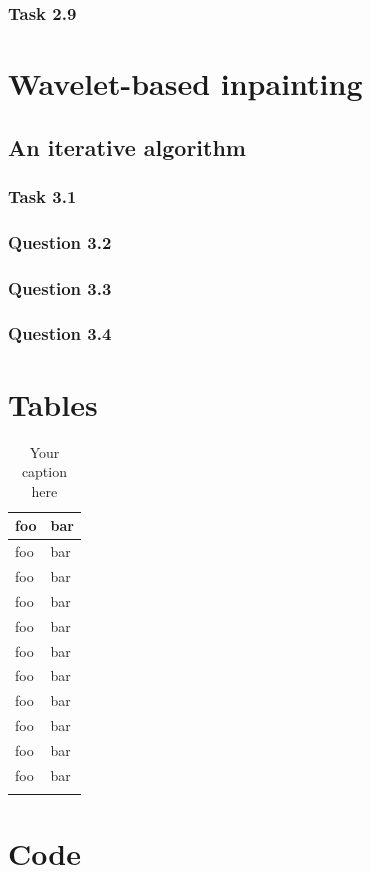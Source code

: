 \documentclass[a4paper]{article}
\begin{document}
    \subsubsection{Task 2.9}

	\newpage
	
    \section{Wavelet-based inpainting}

    \subsection{An iterative algorithm}

    \subsubsection{Task 3.1}

    \subsubsection{Question 3.2}

    \subsubsection{Question 3.3}

    \subsubsection{Question 3.4}

	\newpage

	\appendix
	
	\section{Tables}
	
	\begin{longtable}{| p{} | p{} |} 
	\hline
	foo & bar \\ \hline 
	foo & bar \\ \hline
	foo & bar \\ \hline
	foo & bar \\ \hline
	foo & bar \\ \hline
	foo & bar \\ \hline
	foo & bar \\ \hline
	foo & bar \\ \hline
	foo & bar \\ \hline
	foo & bar \\ \hline
	foo & bar \\ \hline
	\caption{Your caption here} %
	\label{tab:myfirstlongtable}
\end{longtable}

	\section{Code}

 
\end{document}
